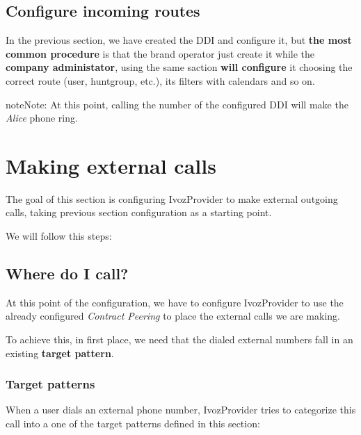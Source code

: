 \documentclass[letterpaper,10pt,english]{sphinxmanual}
\begin{document}
\section{Configure incoming routes}
\label{getting_started/external_incoming_calls/configure_ddi:configure-incoming-routes}
In the previous section, we have created the DDI and configure it, but \textbf{the
most common procedure} is that the brand operator just create it while the
\textbf{company administator}, using the same saction \textbf{will configure} it choosing
the correct route (user, huntgroup, etc.), its filters with calendars and so on.

\begin{notice}{note}{Note:}
At this point, calling the number of the configured DDI will make the
\emph{Alice} phone ring.
\end{notice}


\chapter{Making external calls}
\label{getting_started/external_outgoing_calls/index:making-external-calls}\label{getting_started/external_outgoing_calls/index::doc}
The goal of this section is configuring IvozProvider to make external outgoing
calls, taking previous section configuration as a starting point.

We will follow this steps:


\section{Where do I call?}
\label{getting_started/external_outgoing_calls/where_do_i_call::doc}\label{getting_started/external_outgoing_calls/where_do_i_call:where-do-i-call}
At this point of the configuration, we have to configure IvozProvider to use the
already configured \emph{Contract Peering} to place the external calls we are making.

To achieve this, in first place, we need that the dialed external numbers fall
in an existing \textbf{target pattern}.


\subsection{Target patterns}
\label{brand/routing/target_patterns:target-patterns}\label{brand/routing/target_patterns::doc}\label{brand/routing/target_patterns:id1}
When a user dials an external phone number, IvozProvider tries to categorize
this call into a one of the target patterns defined in this section:
\end{document}

